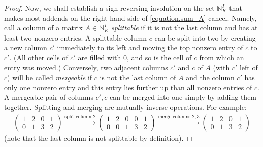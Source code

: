 \documentclass[revision]{FPSAC2025}
\newcommand{\NN}{\mathbb{N}} %
\begin{document}
\begin{proof}
Now, we shall establish a sign-reversing involution on the set $\NN^{I}_K$ that makes most addends on the right hand side of \eqref{equation.sum_A} cancel.
Namely, call a column of a matrix $A \in \NN^{I}_K$ \emph{splittable}
if it is not the last column and has at least two nonzero entries.
A splittable column $c$ can be split into two by creating a new column
$c'$ immediately to its left and moving the top nonzero entry of $c$
to $c'$.
(All other cells of $c'$ are filled with $0$, and so is the cell of
$c$ from which an entry was moved.)
Conversely, two adjacent columns $c'$ and $c$ of $A$
(with $c'$ left of $c$) will be called \emph{mergeable} if
$c$ is not the last column of $A$ and the column $c'$ has
only one nonzero entry and this entry lies further up than all nonzero
entries of $c$. A mergeable pair of columns $c', c$ can be merged
into one simply by adding them together.
Splitting and merging are mutually inverse operations.
For example:
\begin{align*}
\begin{pmatrix}
1 & 2 & 0 & 1 \\ 0 & 1 & 3 & 2
\end{pmatrix}
\overset{\text{split column } 2}{\longrightarrow}
\begin{pmatrix}
1 & 2 & 0 & 0 & 1 \\ 0 & 0 & 1 & 3 & 2
\end{pmatrix}
\overset{\text{merge columns } 2, 3}{\longrightarrow}
\begin{pmatrix}
1 & 2 & 0 & 1 \\ 0 & 1 & 3 & 2
\end{pmatrix}
\end{align*}
(note that the last column is not splittable by definition).


\end{proof}
\end{document}

